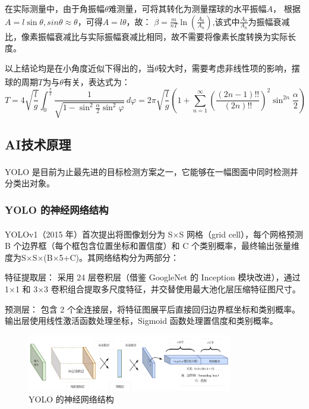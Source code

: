 在实际测量中，由于角振幅$\theta$难测量，可将其转化为测量摆球的水平振幅$A$，
根据$A = l\sin \theta,sin \theta \approx \theta$，可得$A = l\theta$，故：
$\beta = \frac{m}{nT} \ln\left(\frac{A_0}{A_n}\right)$,该式中$\frac{A_0}{A_n}$为振幅衰减比，像素振幅衰减比与实际振幅衰减比相同，故不需要将像素长度转换为实际长度。

以上结论均是在小角度近似下得出的，当$\theta$较大时，需要考虑非线性项的影响，摆球的周期$T$为与$\theta$有关，表达式\textsuperscript{\cite{DXWL200705004}}为：
\begin{equation}
T = 4 \sqrt{\frac{l}{g}} \int_{0}^{\frac{\pi}{2}} \frac{1}{\sqrt{1 - \sin^2 \frac{\alpha}{2} \sin^2 \varphi}} \, d\varphi
  = 2\pi\sqrt{\frac{l}{g}} \left( 1 + \sum_{n=1}^{\infty} \left( \frac{(2n-1)!!}{(2n)!!} \right)^2 \sin^{2n} \frac{\alpha}{2} \right)
\end{equation}


\subsection{AI技术原理}

YOLO 是目前为止最先进的目标检测方案之一\textsuperscript{\cite{7780460}}，它能够在一幅图面中同时检测并分类出对象。

\subsubsection{YOLO 的神经网络结构}

YOLOv1\textsuperscript{\cite{DBLP:journals/corr/RedmonDGF15}}（2015 年）首次提出将图像划分为 S×S 网格（grid cell），每个网格预测B 个边界框（每个框包含位置坐标和置信度）和 C 个类别概率，最终输出张量维度为S×S×(B×5+C)。其网络结构分为两部分：

特征提取层：
采用 24 层卷积层（借鉴 GoogleNet 的 Inception 模块改进），通过 1×1 和 3×3 卷积组合提取多尺度特征，并交替使用最大池化层压缩特征图尺寸。

预测层：
包含 2 个全连接层，将特征图展平后直接回归边界框坐标和类别概率。输出层使用线性激活函数处理坐标，Sigmoid 函数处理置信度和类别概率。
 \begin{figure}[ht]
    \centering
    \includegraphics[width=0.8\textwidth]{figures/yolo神经网络结构.pdf}
    \caption{YOLO 的神经网络结构}
    \label{fig:yolo}
 \end{figure}

